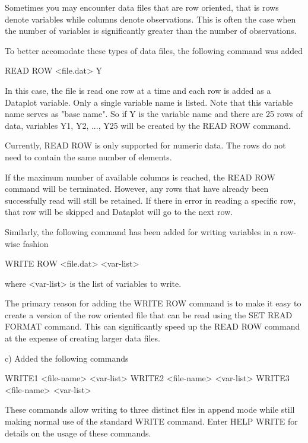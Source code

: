        Sometimes you may encounter data files that are row
       oriented, that is rows denote variables while columns
       denote observations.  This is often the case when the
       number of variables is significantly greater than the
       number of observations.

       To better accomodate these types of data files, the
       following command was added

           READ ROW <file.dat>  Y

       In this case, the file is read one row at a time
       and each row is added as a Dataplot variable.  Only
       a single variable name is listed.  Note that this
       variable name serves as "base name".  So if Y is
       the variable name and there are 25 rows of data,
       variables Y1, Y2, ..., Y25 will be created by the
       READ ROW command.

       Currently, READ ROW is only supported for numeric
       data.  The rows do not need to contain the same
       number of elements.

       If the maximum number of available columns is reached,
       the READ ROW command will be terminated.  However,
       any rows that have already been successfully read
       will still be retained.  If there in error in reading
       a specific row, that row will be skipped and Dataplot
       will go to the next row.

       Similarly, the following command has been added for
       writing variables in a row-wise fashion

           WRITE ROW <file.dat>  <var-list>

       where <var-list> is the list of variables to write.

       The primary reason for adding the WRITE ROW command
       is to make it easy to create a version of the
       row oriented file that can be read using the
       SET READ FORMAT command.  This can significantly
       speed up the READ ROW command at the expense of
       creating larger data files.

    c) Added the following commands

          WRITE1 <file-name> <var-list>
          WRITE2 <file-name> <var-list>
          WRITE3 <file-name> <var-list>

       These commands allow writing to three distinct files in
       append mode while still making normal use of the standard
       WRITE command.  Enter HELP WRITE for details on the usage
       of these commands.

